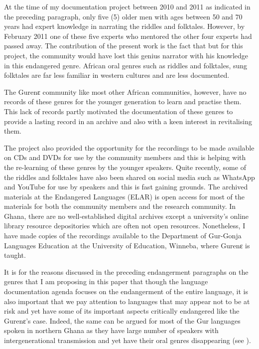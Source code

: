 \documentclass[output=paper,colorlinks,citecolor=brown]{langscibook}
\begin{document}
At the time of my documentation project between 2010 and 2011 as indicated in the preceding paragraph, only five (5) older men with ages between 50 and 70 years had expert knowledge in narrating the riddles and folktales. However, by February 2011 one of these five experts who mentored the other four experts had passed away. The contribution of the present work is the fact that but for this project, the community would have lost this genius narrator with his knowledge in this endangered genre. African oral genres such as riddles and folktales, sung folktales are far less familiar in western cultures and are less documented. 

The Gurenɛ community like most other African communities, however, have no records of these genres for the younger generation to learn and practise them. This lack of records partly motivated the documentation of these genres to provide a lasting record in an archive and also with a keen interest in revitalising them. 

The project also provided the opportunity for the recordings to be made available on CDs and DVDs for use by the community members and this is helping with the re-learning of these genres by the younger speakers. Quite recently, some of the riddles and folktales have also been shared on social media such as WhatsApp and YouTube for use by speakers and this is fast gaining grounds. The archived materials at the Endangered Languages (ELAR) is open access for most of the materials for both the community members and the research community. In Ghana, there are no well-established digital archives except a university’s online library resource depositories which are often not open resources. Nonetheless, I have made copies of the recordings available to the Department of Gur-Gonja Languages Education at the University of Education, Winneba, where Gurenɛ is taught.

It is for the reasons discussed in the preceding endangerment paragraphs on the genres that  
I am proposing in this paper that though the language documentation agenda focuses on the endangerment of the entire language, it is also important that we pay attention to languages that may appear not to be at risk and yet have some of its important aspects critically endangered like the Gurenɛ’s case. Indeed, the same can be argued for most of the Gur languages spoken in northern Ghana as they have large number of speakers with intergenerational transmission and yet have their oral genres disappearing (see \citealt{Bodomo2004, Bodomo2020}).
\end{document}
